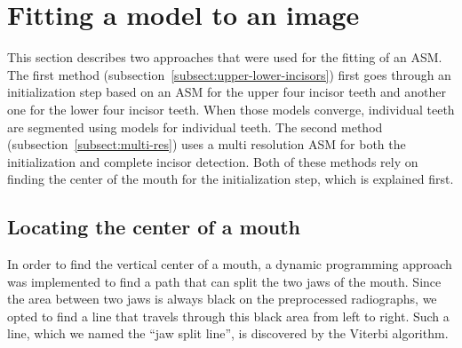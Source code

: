 \documentclass[a4paper]{article}
\begin{document}



\section{Fitting a model to an image}
\label{sect:init-estimate}
This section describes two approaches that were used for the fitting of an ASM.
The first method (subsection~\ref{subsect:upper-lower-incisors}) first goes through an initialization step based on an ASM for the upper four incisor teeth and another one for the lower four incisor teeth. When those models converge, individual teeth are segmented using models for individual teeth.
The second method (subsection~\ref{subsect:multi-res}) uses a multi resolution ASM for both the initialization and complete incisor detection.
Both of these methods rely on finding the center of the mouth for the initialization step, which is explained first.

\subsection{Locating the center of a mouth}
\label{subsect:center of mouth}
In order to find the vertical center of a mouth, a dynamic programming approach was implemented to find a path that can split the two jaws of the mouth. Since the area between two jaws is always black on the preprocessed radiographs, we opted to find a line that travels through this black area from left to right. Such a line, which we named the ``jaw split line'', is discovered by the Viterbi algorithm. 
\end{document}
